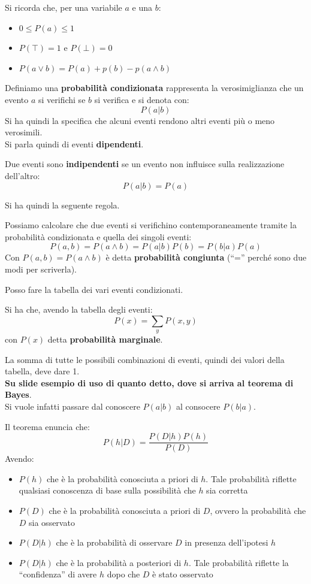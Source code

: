 \message{ !name(modprob.tex)}\documentclass[a4paper,12pt, oneside]{book}
\begin{document}
Si ricorda che, per una variabile $a$ e una $b$:
\begin{itemize}
  \item $0\leq P(a)\leq 1$
  \item $P(\top)=1$ e $P(\bot) =0$
  \item $P(a\lor b) = P(a)+p(b) -p(a\land b)$
\end{itemize}
\begin{definizione}
  Definiamo una \textbf{probabilità condizionata} rappresenta la verosimiglianza
  che un evento $a$ si verifichi se $b$ si verifica e si denota con:
  \[P(a|b)\]
  Si ha quindi la specifica che alcuni eventi rendono altri eventi più o meno
  verosimili.\\
  Si parla quindi di eventi \textbf{dipendenti}.
\end{definizione}
\begin{definizione}
  Due eventi sono \textbf{indipendenti} se un evento non influisce sulla
  realizzazione dell'altro:
  \[P(a|b)=P(a)\]
\end{definizione}
Si ha quindi la seguente regola.
\begin{teorema}
  Possiamo calcolare che due eventi si verifichino contemporaneamente tramite la
  probabilità condizionata e quella dei singoli eventi:
  \[P(a,b)=P(a\land b)=P(a|b)P(b)=P(b|a)P(a)\]
  Con $P(a,b)=P(a\land b)$ è detta \textbf{probabilità congiunta} (``='' perché
  sono due modi per scriverla).
\end{teorema}
Posso fare la tabella dei vari eventi condizionati.
\begin{teorema}
  Si ha che, avendo la tabella degli eventi:
  \[P(x)=\sum_y P(x,y)\]
  con $P(x)$ detta \textbf{probabilità marginale}.
\end{teorema}
La somma di tutte le possibili combinazioni di eventi, quindi dei valori della
tabella, deve dare 1.\\ 
\textbf{Su slide esempio di uso di quanto detto, dove si arriva al teorema di
  Bayes}.\\
Si vuole infatti passare dal conoscere $P(a|b)$ al consocere $P(b|a)$.
\begin{teorema}
  Il teorema enuncia che:
  \[P(h|D)=\frac{P(D|h)P(h)}{P(D)}\]
  Avendo:
  \begin{itemize}
    \item $P(h)$ che è la probabilità conosciuta a priori di $h$. Tale
    probabilità riflette qualsiasi conoscenza di base sulla possibilità
    che $h$ sia corretta  
    \item $P(D)$ che è la probabilità conosciuta a priori di $D$, ovvero la
    probabilità che $D$ sia osservato
    \item $P(D|h)$ che è la probabilità di osservare $D$ in presenza
    dell'ipotesi $h$
    \item $P(D|h)$ che è la probabilità a posteriori di $h$. Tale probabilità
    riflette la ``confidenza'' di avere $h$  dopo che $D$ è stato osservato
  \end{itemize}
\end{teorema}
\end{document}
